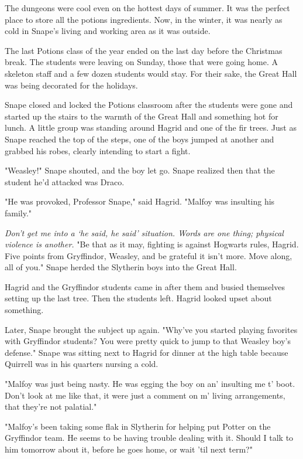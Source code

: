 The dungeons were cool even on the hottest days of summer. It was the perfect place to store all the potions ingredients. Now, in the winter, it was nearly as cold in Snape's living and working area as it was outside.

The last Potions class of the year ended on the last day before the Christmas break. The students were leaving on Sunday, those that were going home. A skeleton staff and a few dozen students would stay. For their sake, the Great Hall was being decorated for the holidays.

Snape closed and locked the Potions classroom after the students were gone and started up the stairs to the warmth of the Great Hall and something hot for lunch. A little group was standing around Hagrid and one of the fir trees. Just as Snape reached the top of the steps, one of the boys jumped at another and grabbed his robes, clearly intending to start a fight.

"Weasley!" Snape shouted, and the boy let go. Snape realized then that the student he'd attacked was Draco.

"He was provoked, Professor Snape," said Hagrid. "Malfoy was insulting his family."

\emph{Don't get me into a `he said, he said' situation. Words are one thing; physical violence is another.} "Be that as it may, fighting is against Hogwarts rules, Hagrid. Five points from Gryffindor, Weasley, and be grateful it isn't more. Move along, all of you." Snape herded the Slytherin boys into the Great Hall.

Hagrid and the Gryffindor students came in after them and busied themselves setting up the last tree. Then the students left. Hagrid looked upset about something.

Later, Snape brought the subject up again. "Why've you started playing favorites with Gryffindor students? You were pretty quick to jump to that Weasley boy's defense." Snape was sitting next to Hagrid for dinner at the high table because Quirrell was in his quarters nursing a cold.

"Malfoy was just being nasty. He was egging the boy on an' insulting me t' boot. Don't look at me like that, it were just a comment on m' living arrangements, that they're not palatial."

"Malfoy's been taking some flak in Slytherin for helping put Potter on the Gryffindor team. He seems to be having trouble dealing with it. Should I talk to him tomorrow about it, before he goes home, or wait 'til next term?"

